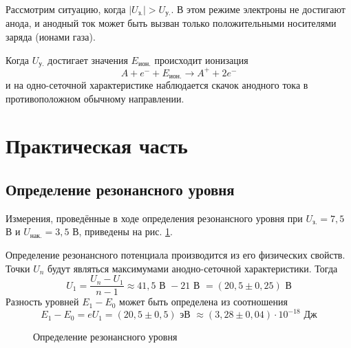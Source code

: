 \documentclass[a4paper]{article}
\begin{document}
Рассмотрим ситуацию, когда $|U_\text{з.}| > U_\text{у.}$. В этом режиме электроны
не достигают анода, и анодный ток может быть вызван только
положительными носителями заряда (ионами газа).

Когда $U_\text{у.}$ достигает значения $E_\text{ион.}$ происходит ионизация
$$
    A + e^- + E_\text{ион.} \rightarrow A^+ + 2e^-
$$
и на одно-сеточной характеристике наблюдается скачок анодного тока в
противоположном обычному направлении.

\section*{\centering Практическая часть}

\subsection*{Определение резонансного уровня}

Измерения, проведённые в ходе определения резонансного уровня при $U_\text{з.} = 7,5$ В и $U_\text{нак.} = 3,5$ В,
приведены на рис. \ref{Определение резонансного уровня}.

Определение резонансного потенциала производится из его физических свойств.
Точки $U_n$ будут являться максимумами анодно-сеточной характеристики. Тогда
$$
    U_1 = \dfrac{U_n - U_1}{n - 1} \approx 41,5 \text{ В } - 21 \text{ В } = (20,5 \pm 0,25) \text{ В}
$$
Разность уровней $E_1 - E_0$ может быть определена из соотношения
$$
    E_1 - E_0 = e U_1 = (20,5 \pm 0,5) \text{ эВ } \approx (3,28 \pm 0,04) \cdot 10^{-18} \text{ Дж}
$$

\begin{figure}[h]
    \centering
    \caption{Определение резонансного уровня}
    \label{Определение резонансного уровня}
\end{figure}
\end{document}
